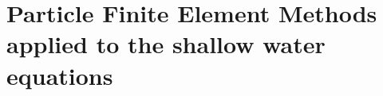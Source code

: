 
\chapter{Particle Finite Element Methods applied to the shallow water equations}
\label{lagrangian_sw}



